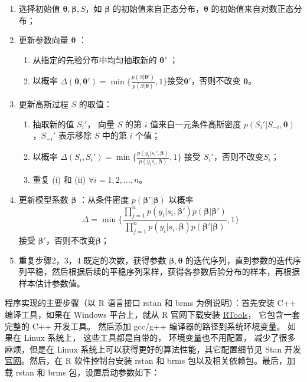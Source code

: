 \documentclass[12pt,a4paper,UTF8,twoside]{book}
\providecommand{\tightlist}{%
  \setlength{\itemsep}{0pt}\setlength{\parskip}{0pt}}
\theoremstyle{definition}
\theoremstyle{definition}
\theoremstyle{definition}
\theoremstyle{remark}
\begin{document}
\begin{enumerate}
\def\labelenumi{\arabic{enumi}.}
\tightlist
\item
  选择初始值 \(\boldsymbol{\theta},\boldsymbol{\beta},S\)，如
  \(\boldsymbol{\beta}\) 的初始值来自正态分布，\(\boldsymbol{\theta}\)
  的初始值来自对数正态分布；
\item
  更新参数向量 \(\boldsymbol{\theta}\) ：

  \begin{enumerate}
  \def\labelenumii{(\roman{enumii})}
  \tightlist
  \item
    从指定的先验分布中均匀抽取新的 \(\boldsymbol{\theta}'\) ；
  \item
    以概率
    \(\Delta(\boldsymbol{\theta},\boldsymbol{\theta}') = \min \big\{\frac{p(S|\boldsymbol{\theta}')}{p(S|\boldsymbol{\theta})},1\big\}\)接受\(\boldsymbol{\theta}'\)，否则不改变
    \(\boldsymbol{\theta}\)。
  \end{enumerate}
\item
  更新高斯过程 \(S\) 的取值：

  \begin{enumerate}
  \def\labelenumii{(\roman{enumii})}
  \tightlist
  \item
    抽取新的值 \(S_{i}'\)， 向量 \(S\) 的第 \(i\) 值来自一元条件高斯密度
    \(p(S_{i}'|S_{-i},\boldsymbol{\theta})\)，\(S_{-i}'\) 表示移除 \(S\)
    中的第 \(i\) 个值；
  \item
    以概率
    \(\Delta(S_{i},S_{i}') = \min\big\{ \frac{p(y_{i}|s_{i}',\boldsymbol{\beta})}{p(y_{i}s_{i},\boldsymbol{\beta})},1 \big\}\)
    接受 \(S_{i}'\)，否则不改变\(S_i\)；
  \item
    重复 (i) 和 (ii) \(\forall i = 1,2,\ldots,n\)。
  \end{enumerate}
\item
  更新模型系数 \(\boldsymbol{\beta}\) ：从条件密度
  \(p(\boldsymbol{\beta}'|\boldsymbol{\beta})\) 以概率
  \[\Delta = \min \big\{ \frac{\prod_{j=1}^{n}p(y_i|s_{i},\boldsymbol{\beta}')p(\boldsymbol{\beta}|\boldsymbol{\beta}')}{\prod_{j=1}^{n}p(y_i|s_{i},\boldsymbol{\beta})p(\boldsymbol{\beta}'|\boldsymbol{\beta})},1  \big\}\]
  接受 \(\boldsymbol{\beta}'\)，否则不改变\(\boldsymbol{\beta}\)；
\item
  重复步骤2，3，4 既定的次数，获得参数
  \(\boldsymbol{\beta},\boldsymbol{\theta}\)
  的迭代序列，直到参数的迭代序列平稳，然后根据后续的平稳序列采样，获得各参数后验分布的样本，再根据样本估计参数值。
\end{enumerate}

程序实现的主要步骤（以 R 语言接口 rstan 和 brms 为例说明）：首先安装 C++
编译工具，如果在 Windows 平台上，就从 R 官网下载安装
\href{https://cran.r-project.org/bin/windows/Rtools/}{RTools}，
它包含一套完整的 C++ 开发工具。 然后添加 gcc/g++
编译器的路径到系统环境变量。 如果在 Linux 系统上， 这些工具都是自带的，
环境变量也不用配置， 减少了很多麻烦，但是在 Linux
系统上可以获得更好的算法性能，其它配置细节见 Stan
开发\href{https://github.com/stan-dev/rstan/wiki}{官网}。然后，在 R
软件控制台安装 rstan 和 brms 包以及相关依赖包。最后，加载 rstan 和 brms
包，设置启动参数如下：
\end{document}
